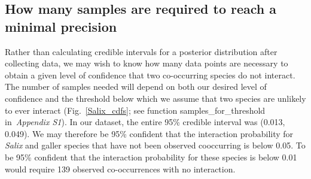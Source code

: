 \documentclass[12pt]{article}
\begin{document}
\begin{spacing}{2.0}


  \subsection*{How many samples are required to reach a minimal precision}


      Rather than calculating credible intervals for a posterior distribution after collecting data, we may wish to know how many data points are necessary to obtain a given level of confidence that two co-occurring species do not interact. The number of samples needed will depend on both our desired level of confidence and the threshold below which we assume that two species are unlikely to ever interact (Fig.~\ref{Salix_cdfs}; see function samples\_for\_threshold in~\emph{Appendix S1}). In our dataset, the entire 95\% credible interval was (0.013, 0.049). We may therefore be 95\% confident that the interaction probability for \emph{Salix} and galler species that have not been observed cooccurring is below 0.05. To be 95\% confident that the interaction probability for these species is below 0.01 would require 139 observed co-occurrences with no interaction.



\end{spacing}
\end{document}
